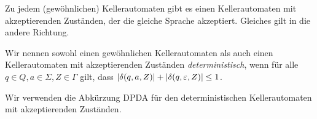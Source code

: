 \begin{lemma}
Zu jedem (gewöhnlichen) Kellerautomaten gibt es einen Kellerautomaten mit akzeptierenden Zuständen, der die gleiche Sprache akzeptiert.
Gleiches gilt in die andere Richtung.
\end{lemma}




\begin{Def}[name={[DPDA]}]
Wir nennen sowohl einen gewöhnlichen Kellerautomaten als auch einen Kellerautomaten mit akzeptierenden Zuständen \emph{deterministisch},
wenn für alle $q\in Q,a\in\Sigma,Z\in\Gamma$ gilt, dass $|\delta(q,a,Z)| + |\delta(q,\varepsilon,Z)| \leq 1$.

Wir verwenden die Abkürzung \ac{DPDA} für den deterministischen Kellerautomaten mit akzeptierenden Zuständen.
\end{Def}

